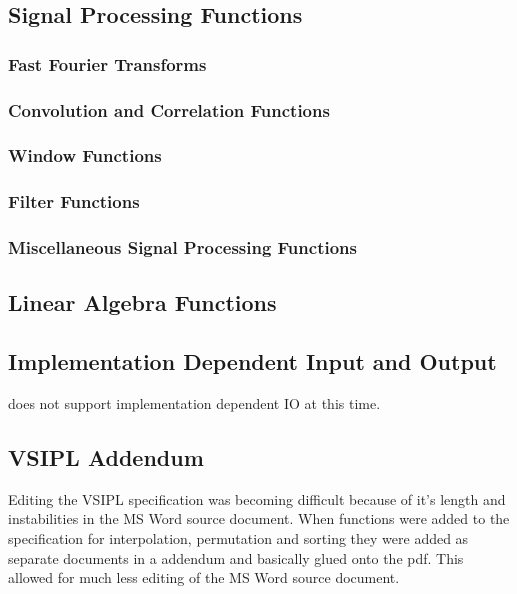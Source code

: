 \subsection*{Signal Processing Functions}
    
\subsubsection*{Fast Fourier Transforms} 

%
\subsubsection*{Convolution and Correlation Functions} 

%
\subsubsection*{Window Functions} 

%
\subsubsection*{Filter Functions} 

%
\subsubsection*{Miscellaneous Signal Processing Functions} 

%
\subsection*{Linear Algebra Functions}
    
\subsection*{Implementation Dependent Input and Output}
    does not support implementation dependent IO at this time.
\subsection*{VSIPL Addendum}
Editing the VSIPL specification was becoming difficult because of it's length and instabilities in the MS Word source document. When functions were added to the specification for interpolation, permutation and sorting they were added as separate documents in a addendum and basically glued onto the pdf. This allowed for much less editing of the MS Word source document.
